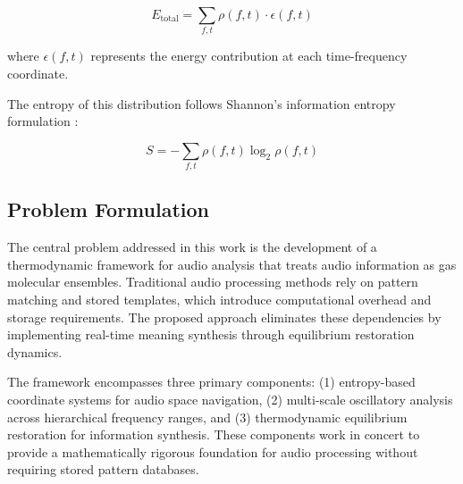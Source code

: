 \begin{equation}
E_{\text{total}} = \sum_{f,t} \rho(f,t) \cdot \epsilon(f,t)
\end{equation}

where $\epsilon(f,t)$ represents the energy contribution at each time-frequency coordinate.

The entropy of this distribution follows Shannon's information entropy formulation \cite{shannon1948}:

\begin{equation}
S = -\sum_{f,t} \rho(f,t) \log_2 \rho(f,t)
\end{equation}


\subsection{Problem Formulation}

The central problem addressed in this work is the development of a thermodynamic framework for audio analysis that treats audio information as gas molecular ensembles. Traditional audio processing methods rely on pattern matching and stored templates, which introduce computational overhead and storage requirements. The proposed approach eliminates these dependencies by implementing real-time meaning synthesis through equilibrium restoration dynamics.

The framework encompasses three primary components: (1) entropy-based coordinate systems for audio space navigation, (2) multi-scale oscillatory analysis across hierarchical frequency ranges, and (3) thermodynamic equilibrium restoration for information synthesis. These components work in concert to provide a mathematically rigorous foundation for audio processing without requiring stored pattern databases.

